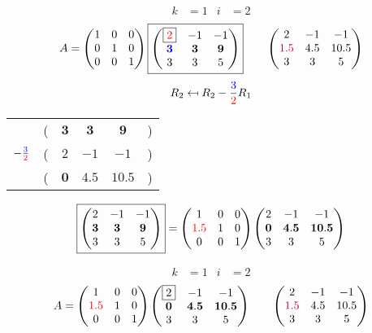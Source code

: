 \documentclass[pdf]{beamer}
\begin{document}
\begin{frame}{}\begin{align*} k &= 1 & i &= 2 \end{align*} $$A=\begin{pmatrix}1&0&0\\0&1&0\\0&0&1\end{pmatrix} \boxed{\begin{pmatrix}\boxed{{\color{red}2}}&-1&-1\\\mathbf{{\color{blue}3}}&\mathbf{3}&\mathbf{9}\\3&3&5\end{pmatrix}} \quad\quad \begin{pmatrix}2&-1&-1\\{\color{purple}1.5}&4.5&10.5\\3&3&5\end{pmatrix}$$ $$R_2 \mapsfrom R_2 - \frac{{\color{blue}3}}{{\color{red}2}} R_1$$ \begin{center}\begin{tabular}{cccccc}  &(& $ \mathbf{3} $ & $ \mathbf{3} $ & $ \mathbf{9} $ &)\\$ -\frac{{\color{blue}3}}{{\color{red}2}} $&(& $ 2 $ & $ -1 $ & $ -1 $ &)\\\hline  &(& $ \mathbf{0} $ & $ \mathbf{4.5} $ & $ \mathbf{10.5} $ &) \end{tabular}\end{center} $$ \boxed{\begin{pmatrix}2&-1&-1\\\mathbf{3}&\mathbf{3}&\mathbf{9}\\3&3&5\end{pmatrix}} = \begin{pmatrix}1&0&0\\{\color{red}1.5}&1&0\\0&0&1\end{pmatrix} \begin{pmatrix}2&-1&-1\\\mathbf{0}&\mathbf{4.5}&\mathbf{10.5}\\3&3&5\end{pmatrix} $$\end{frame}
\begin{frame}{}\begin{align*} k &= 1 & i &= 2 \end{align*}$$A=\begin{pmatrix}1&0&0\\{\color{red}1.5}&1&0\\0&0&1\end{pmatrix} \begin{pmatrix}\boxed{2}&-1&-1\\\mathbf{0}&\mathbf{4.5}&\mathbf{10.5}\\3&3&5\end{pmatrix} \quad\quad \begin{pmatrix}2&-1&-1\\{\color{purple}1.5}&4.5&10.5\\3&3&5\end{pmatrix}$$\end{frame}
\end{document}
